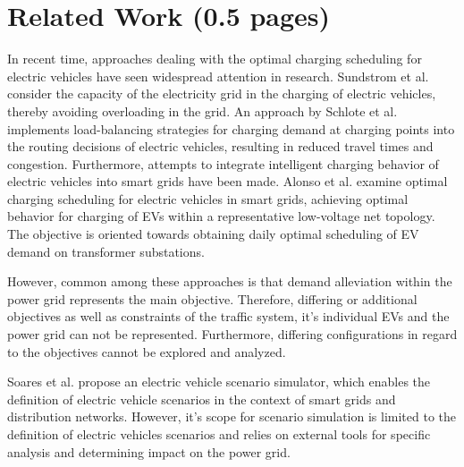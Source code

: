 \section{Related Work (0.5 pages)}

In recent time, approaches dealing with the optimal charging scheduling for electric vehicles have seen widespread attention in research. 
Sundstrom et al. \cite{sundstrom2010planning} consider the capacity of the electricity grid in the charging of electric vehicles, thereby avoiding overloading in the grid.
An approach by Schlote et al. \cite{schlote2012balanced} implements load-balancing strategies for charging demand at charging points into the routing decisions of electric vehicles, resulting in reduced travel times and congestion. 
Furthermore, attempts to integrate intelligent charging behavior of electric vehicles into smart grids have been made. Alonso et al. \cite{alonso2014optimal} examine optimal charging scheduling for electric vehicles in smart grids, achieving optimal behavior for charging of EVs within a representative low-voltage net topology. The objective is oriented towards obtaining daily optimal scheduling of EV demand on transformer substations.

However, common among these approaches is that demand alleviation within the power grid represents the main objective. Therefore, differing or additional objectives as well as constraints of the traffic system, it's individual EVs and the power grid can not be represented. Furthermore, differing configurations in regard to the objectives cannot be explored and analyzed. 


Soares et al. \cite{soares2012electric} propose an electric vehicle scenario simulator, which enables the definition of electric vehicle scenarios in the context of smart grids and distribution networks.
However, it's scope for scenario simulation is limited to the definition of electric vehicles scenarios and relies on external tools for specific analysis and determining impact on the power grid.


